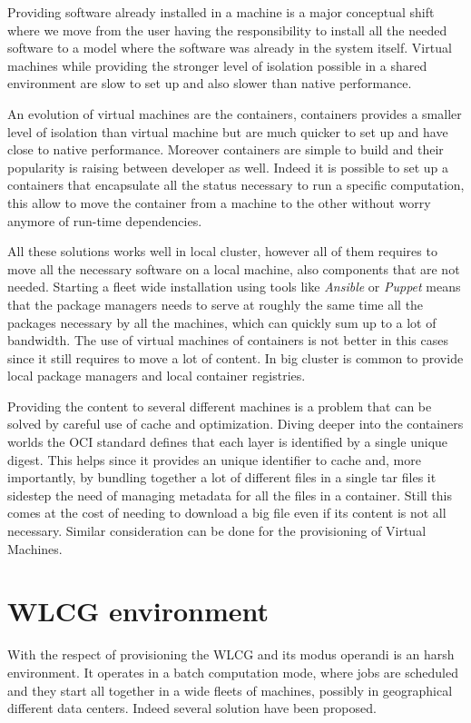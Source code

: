 Providing software already installed in a machine is a major conceptual shift
where we move from the user having the responsibility to install all the needed
software to a model where the software was already in the system itself.
Virtual machines while providing the stronger level of isolation possible in a
shared environment are slow to set up and also slower than native performance.

An evolution of virtual machines are the containers, containers provides a
smaller level of isolation than virtual machine but are much quicker to set up
and have close to native performance. Moreover containers are simple to build
and their popularity is raising between developer as well. Indeed it is
possible to set up a containers that encapsulate all the status necessary to
run a specific computation, this allow to move the container from a machine to
the other without worry anymore of run-time dependencies.

All these solutions works well in local cluster, however all of them requires
to move all the necessary software on a local machine, also components that are
not needed. Starting a fleet wide installation using tools like
\textit{Ansible} or \textit{Puppet} means that the package managers needs to
serve at roughly the same time all the packages necessary by all the machines,
which can quickly sum up to a lot of bandwidth. The use of virtual machines of
containers is not better in this cases since it still requires to move a lot of
content. In big cluster is common to provide local package managers and local
container registries.

Providing the content to several different machines is a problem that can be
solved by careful use of cache and optimization. Diving deeper into the
containers worlds the OCI standard defines that each layer is identified by a
single unique digest. This helps since it provides an unique identifier to
cache and, more importantly, by bundling together a lot of different files in a
single tar files it sidestep the need of managing metadata for all the files in
a container. Still this comes at the cost of needing to download a big file
even if its content is not all necessary. Similar consideration can be done for
the provisioning of Virtual Machines.

\section{WLCG environment} 

With the respect of provisioning the WLCG and its modus operandi is an harsh
environment. It operates in a batch computation mode, where jobs are scheduled
and they start all together in a wide fleets of machines, possibly in
geographical different data centers. Indeed several solution have been
proposed.

